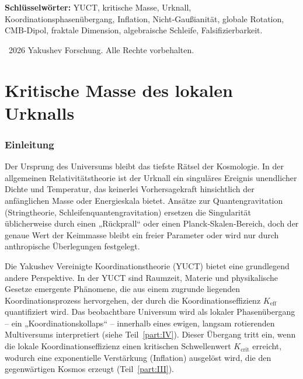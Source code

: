 \documentclass[11pt,a4paper]{article}
\begin{document}
	\vspace{0.1cm}
	\noindent
	{\color{darkblue}\textbf{Schlüsselwörter:}} YUCT, kritische Masse, Urknall, Koordinationsphasenübergang, Inflation, Nicht‑Gaußianität, globale Rotation, CMB‑Dipol, fraktale Dimension, algebraische Schleife, Falsifizierbarkeit.
	
	\vspace{0.5cm}
	\noindent
	\textcopyright\ 2026 Yakushev Forschung. Alle Rechte vorbehalten.
	
	\tableofcontents
	\newpage
	
	\part{Kritische Masse des lokalen Urknalls}
	\label{part:I}
	
	\section{Einleitung}
	
	Der Ursprung des Universums bleibt das tiefste Rätsel der Kosmologie. In der allgemeinen Relativitätstheorie ist der Urknall ein singuläres Ereignis unendlicher Dichte und Temperatur, das keinerlei Vorhersagekraft hinsichtlich der anfänglichen Masse oder Energieskala bietet. Ansätze zur Quantengravitation (Stringtheorie, Schleifenquantengravitation) ersetzen die Singularität üblicherweise durch einen „Rückprall“ oder einen Planck‑Skalen‑Bereich, doch der genaue Wert der Keimmasse bleibt ein freier Parameter oder wird nur durch anthropische Überlegungen festgelegt.
	
	Die Yakushev Vereinigte Koordinationstheorie (YUCT) bietet eine grundlegend andere Perspektive. In der YUCT sind Raumzeit, Materie und physikalische Gesetze emergente Phänomene, die aus einem zugrunde liegenden Koordinationsprozess hervorgehen, der durch die Koordinationseffizienz \(K_{\mathrm{eff}}\) quantifiziert wird. Das beobachtbare Universum wird als lokaler Phasenübergang – ein „Koordinationskollaps“ – innerhalb eines ewigen, langsam rotierenden Multiversums interpretiert (siehe Teil~\ref{part:IV}). Dieser Übergang tritt ein, wenn die lokale Koordinationseffizienz einen kritischen Schwellenwert \(K_{\mathrm{crit}}\) erreicht, wodurch eine exponentielle Verstärkung (Inflation) ausgelöst wird, die den gegenwärtigen Kosmos erzeugt (Teil~\ref{part:III}).
	
\end{document}
